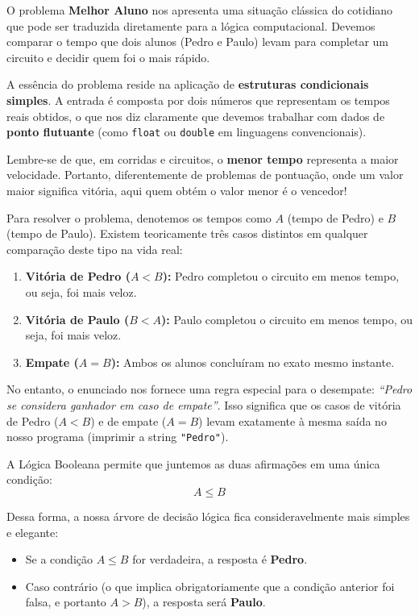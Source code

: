 \documentclass[12pt]{article}
\begin{document}
O problema \textbf{Melhor Aluno} nos apresenta uma situação clássica do cotidiano que pode ser traduzida diretamente para a lógica computacional. Devemos comparar o tempo que dois alunos (Pedro e Paulo) levam para completar um circuito e decidir quem foi o mais rápido.

A essência do problema reside na aplicação de \textbf{estruturas condicionais simples}. A entrada é composta por dois números que representam os tempos reais obtidos, o que nos diz claramente que devemos trabalhar com dados de \textbf{ponto flutuante} (como \texttt{float} ou \texttt{double} em linguagens convencionais).

\begin{notebox}
Lembre-se de que, em corridas e circuitos, o \textbf{menor tempo} representa a maior velocidade. Portanto, diferentemente de problemas de pontuação, onde um valor maior significa vitória, aqui quem obtém o valor menor é o vencedor!
\end{notebox}

Para resolver o problema, denotemos os tempos como $A$ (tempo de Pedro) e $B$ (tempo de Paulo). Existem teoricamente três casos distintos em qualquer comparação deste tipo na vida real:
\begin{enumerate}
    \item \textbf{Vitória de Pedro ($A < B$):} Pedro completou o circuito em menos tempo, ou seja, foi mais veloz.
    \item \textbf{Vitória de Paulo ($B < A$):} Paulo completou o circuito em menos tempo, ou seja, foi mais veloz.
    \item \textbf{Empate ($A = B$):} Ambos os alunos concluíram no exato mesmo instante.
\end{enumerate}

No entanto, o enunciado nos fornece uma regra especial para o desempate: \textit{``Pedro se considera ganhador em caso de empate''}. Isso significa que os casos de vitória de Pedro ($A < B$) e de empate ($A = B$) levam exatamente à mesma saída no nosso programa (imprimir a string \texttt{"Pedro"}).

A Lógica Booleana permite que juntemos as duas afirmações em uma única condição:
\[ A \leq B \]

Dessa forma, a nossa árvore de decisão lógica fica consideravelmente mais simples e elegante:
\begin{itemize}
    \item Se a condição $A \leq B$ for verdadeira, a resposta é \textbf{Pedro}.
    \item Caso contrário (o que implica obrigatoriamente que a condição anterior foi falsa, e portanto $A > B$), a resposta será \textbf{Paulo}.
\end{itemize}
\end{document}
